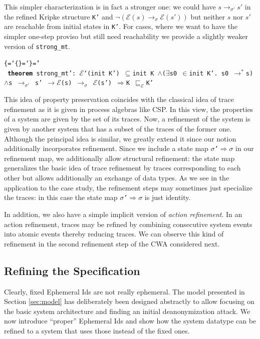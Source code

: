 \documentclass{llncs}
\newenvironment{ttbox}{\begin{alltt}\ttbraces\small\tt}%
                      {\end{alltt}}
\def\ttbraces{\let\.=\nobreak\chardef\{=`\{\chardef\}=`\}\chardef\|=`\\}
\newcommand\ttand{\mbox{{$\land$}}}
\newcommand\ttfun{\mbox{{$\Rightarrow$}}}
\newcommand\ttimp{\mbox{{$\longrightarrow$}}}
\newcommand\ttexists{\mbox{{$\exists$}}}
\newcommand\ttin{\mbox{{$\in$}}}
\newcommand\ttImp{\mbox{{$\Longrightarrow$}}}
\newcommand\ttrelIstar{\mbox{{$\to^*$}}}
\newcommand\ttrel[1]{\mbox{{$\to_{#1}$}}}
\newcommand\ttsubseteq{\mbox{{$\subseteq$}}}
\newcommand\ttsigma{\mbox{{$\sigma$}}}
\newcommand\ttmref[1]{\mbox{{$\sqsubseteq_{#1}$}}}
\newcommand\ttmeref{\ttmref{\mathcal{E}}}
\newcommand\ttecal{\mbox{$\mathcal{E}$}}
\newcommand\ttimg{\mbox{\texttt{`}}}
\begin{document}
This simpler characterization is in fact a stronger one: we could have $s \ttrel{\sigma'} s'$ 
in the refined Kripke structure \texttt{K'} and $\neg(\ttecal(s) \ttrel{\sigma} \ttecal(s'))$
but neither $s$ nor $s'$ are reachable from initial states in \texttt{K'}.
For cases, where we want to have the simpler one-step proviso but still need 
reachability we provide a slightly weaker version of \texttt{strong\_mt}.
\begin{ttbox}
{\bf{theorem}} strong_mt':  
\ttecal\ttimg(init K') \ttsubseteq init K \ttand (\ttexists s0 \ttin init K'. s0  \ttrelIstar s)
 \ttand s \ttrel{\sigma'} s' \ttimp \ttecal(s) \ttrel{\sigma} \ttecal(s') \ttImp K \ttmeref K'
\end{ttbox}
This idea of property preservation coincides with the classical idea of
trace refinement as it is given in process algebras like CSP. In this view,
the properties of a system are given by the set of its traces. Now, a refinement
of the system is given by another system that has a subset of the traces of the 
former one.
Although the principal idea is similar, we greatly extend it since our notion
additionally incorporates refinement. Since we include a state map 
\texttt{\ttsigma'\ttfun \ttsigma} in our refinement map, we additionally
allow structural refinement: the state map generalizes the basic idea of
trace refinement by traces corresponding to each other but allows additionally
an exchange of data types. 
As we see in the application to the case study, the refinement steps may
sometimes just specialize the traces: in this case the state map 
\texttt{\ttsigma'\ttfun \ttsigma} is just identity. 

In addition, we also have a simple implicit version of {\it action refinement}. In an
action refinement, traces may be refined by combining consecutive system events
into atomic events thereby reducing traces.
We can observe this kind of refinement in the second refinement step
of the CWA considered next.

\subsection{Refining the Specification}
\label{sec:corref}
Clearly, fixed Ephemeral Ids are not really ephemeral. The model presented
in Section \ref{sec:model} has deliberately been designed abstractly to allow focusing on
the basic system architecture and finding an initial deanonymization attack.
We now introduce ``proper'' Ephemeral Ids and show how the system datatype can be refined to a system
that uses those instead of the fixed ones.
\end{document}
